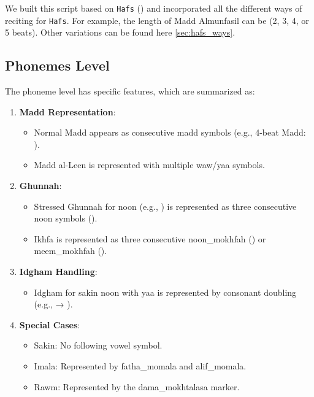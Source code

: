 We built this script based on \texttt{Hafs} () and incorporated all the different ways of reciting for \texttt{Hafs}. For example, the length of Madd Almunfasil can be (2, 3, 4, or 5 beats). Other variations can be found here \ref{sec:hafs_ways}.

\subsection{Phonemes Level}

The phoneme level has specific features, which are summarized as:

\begin{enumerate}
\item \textbf{Madd Representation}:
\begin{itemize}
\item Normal Madd appears as consecutive madd symbols (e.g., 4-beat Madd: ).
\item Madd al-Leen is represented with multiple waw/yaa symbols.
\end{itemize}

\item \textbf{Ghunnah}:
\begin{itemize}
\item Stressed Ghunnah for noon (e.g., ) is represented as three consecutive noon symbols ().
\item Ikhfa is represented as three consecutive noon\_mokhfah () or meem\_mokhfah ().
\end{itemize}

\item \textbf{Idgham Handling}:
\begin{itemize}
\item Idgham for sakin noon with yaa is represented by consonant doubling (e.g.,  → ).
\end{itemize}

\item \textbf{Special Cases}:
\begin{itemize}
\item Sakin: No following vowel symbol.
\item Imala: Represented by fatha\_momala and alif\_momala.
\item Rawm: Represented by the dama\_mokhtalasa marker.
\end{itemize}
\end{enumerate}


